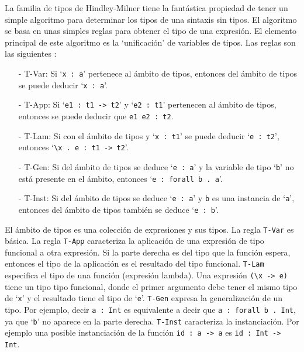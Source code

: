 \documentclass[class=article, crop=false]{standalone}
\begin{document}
La familia de tipos de Hindley-Milner tiene la fantástica propiedad de tener un simple
algoritmo para determinar los tipos de una sintaxis sin tipos. El algoritmo se basa en unas
simples reglas para obtener el tipo de una expresión. El elemento principal de este algoritmo
es la `unificación' de variables de tipos. Las reglas son las siguientes
\cite{write-you-a-haskell}\cite{hindley1969principal}\cite{milner1978theory}:
\begin{itemize}
  \item[-] T-Var: Si `\verb`x : a`' pertenece al ámbito de tipos, entonces del ámbito de
  tipos se puede deducir `\verb`x : a`'.

  \item[-] T-App: Si `\verb`e1 : t1 -> t2`' y `\verb`e2 : t1`' pertenecen al ámbito de tipos,
  entonces se puede deducir que \verb`e1 e2 : t2`.
  
  \item[-] T-Lam: Si con el ámbito de tipos y `\verb`x : t1`' se puede deducir
  `\verb`e : t2`', entonces `\verb`\x . e : t1 -> t2`'.
  
  \item[-] T-Gen: Si del ámbito de tipos se deduce `\verb`e : a`' y la variable de tipo
  `\verb`b`' no está presente en el ámbito, entonces `\verb`e : forall b . a`'.

  \item[-] T-Inst: Si del ámbito de tipos se deduce `\verb`e : a`' y \verb`b` es una
  instancia de `\verb`a`', entonces del ámbito de tipos también se deduce `\verb`e : b`'.
\end{itemize}

El ámbito de tipos es una colección de expresiones y sus tipos. La regla
\verb`T-Var` es básica. La regla \verb`T-App` caracteriza la aplicación de una expresión de
tipo funcional a otra expresión. Si la parte derecha es del tipo que la función espera,
entonces el tipo de la aplicación es el resultado del tipo funcional. \verb`T-Lam` especifica
el tipo de una función (expresión lambda). Una expresión \verb`(\x -> e)` tiene un tipo
tipo funcional, donde el primer argumento debe tener el mismo tipo de `\verb`x`' y el
resultado tiene el tipo de `\verb`e`'. \verb`T-Gen` expresa la generalización de un tipo. Por
ejemplo, decir \verb`a : Int` es equivalente a decir que \verb`a : forall b . Int`, ya que
`\verb`b`' no aparece en la parte derecha. \verb`T-Inst` caracteriza la instanciación. Por
ejemplo una posible instanciación de la función \verb`id : a -> a` es \verb`id : Int -> Int`.
\end{document}
